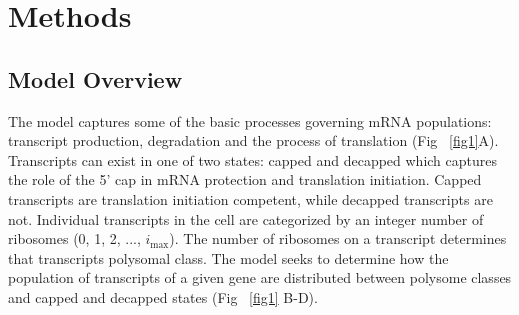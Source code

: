 \documentclass[10pt,letterpaper]{article}
\newcommand{\imax}{\ensuremath{{i_{\max}}}\xspace}
\begin{document}
\section*{Methods}\label{sec:description}
\subsection*{Model Overview}

The model captures some of the basic processes governing mRNA populations: transcript production, degradation and the process of translation (Fig ~\ref{fig1}A).
Transcripts can exist in one of two states: capped and decapped which captures the role of the 5' cap in mRNA protection and translation initiation. 
Capped transcripts are translation initiation competent, while decapped transcripts are not. 
Individual transcripts in the cell are categorized by an integer number of ribosomes (0, 1, 2, ..., \imax).
The number of ribosomes on a transcript determines that transcripts polysomal class.
The model seeks to determine how the population of transcripts of a given gene are distributed between polysome classes and capped and decapped states (Fig ~\ref{fig1} B-D).
\end{document}
